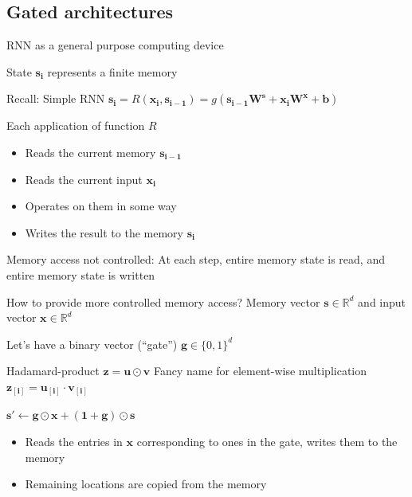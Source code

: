 \documentclass[12pt,aspectratio=169,handout]{beamer}
\begin{document}
	\subsection{Gated architectures}
	
	\begin{frame}{RNN as a general purpose computing device}
		
		State $\bm{s_i}$ represents a finite memory
		
		\begin{block}{Recall: Simple RNN}
			$\bm{s_i} = R(\bm{x_i}, \bm{s_{i - 1}}) = g(\bm{s_{i-1}} \bm{W^s} + \bm{x_i} \bm{W^x} + \bm{b})$ 	
		\end{block}
		\pause
		Each application of function $R$
		\begin{itemize}
			\item Reads the current memory $\bm{s_{i-1}}$
			\item Reads the current input $\bm{x_i}$
			\item Operates on them in some way
			\item Writes the result to the memory $\bm{s_i}$
		\end{itemize}
		\pause Memory access not controlled: At each step, entire memory state is read, and entire memory state is written
	\end{frame}
	
	\begin{frame}{How to provide more controlled memory access?}
		Memory vector $\bm{s} \in \mathbb{R}^d$ and input vector $\bm{x} \in \mathbb{R}^d$
		\pause
		
		Let's have a binary vector (``gate'') $\bm{g} \in \{0, 1\}^d$
		\pause
		\begin{block}{Hadamard-product $\bm{z} = \bm{u} \odot \bm{v}$}
			Fancy name for element-wise multiplication
			$\bm{z_{[i]}} = \bm{u_{[i]}} \cdot \bm{v_{[i]}}$
		\end{block}
		$
		\bm{s'} \gets \bm{g} \odot \bm{x} + (\bm{1} + \bm{g}) \odot \bm{s}
		$
		\begin{itemize}
			\item \pause Reads the entries in $\bm{x}$ corresponding to ones in the gate, writes them to the memory
			\item \pause Remaining locations are copied from the memory
		\end{itemize}
		
	\end{frame}
	
\end{document}
